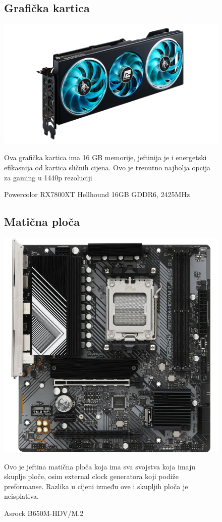 \documentclass{article}
\begin{document}
\begin{figure}[H]
\subsection{Grafička kartica}
\centering
\includegraphics[scale=0.6]{Slike/2307271152084.png}
\caption{Powercolor RX7800XT Hellhound 16GB GDDR6, 2425MHz}
Ova grafička kartica ima 16 GB memorije, jeftinija je i energetski efikasnija od kartica sličnih cijena. Ovo je trenutno najbolja opcija za gaming u 1440p rezoluciji
\end{figure}

\begin{figure}[H]
\subsection{Matična ploča}
\centering
\includegraphics[scale=0.2]{Slike/slika1.jpg}
\caption{Asrock B650M-HDV/M.2}
Ovo je jeftina matična ploča koja ima sva svojstva koja imaju skuplje ploče, osim external clock generatora koji podiže preformanse. Razlika u cijeni između ove i skupljih ploča je neisplativa.
\end{figure}
\end{document}
